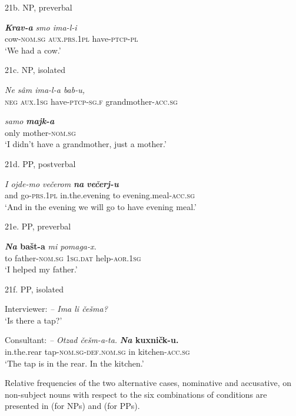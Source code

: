 \documentclass[output=paper]{langscibook}
\begin{document}
21b.     NP, preverbal

\textbf{\textit{Krav-a} } \textit{smo                 ima-l-i}\\
cow-\textsc{nom.sg}  \textsc{aux.prs}.1\textsc{pl}     have-\textsc{ptcp-pl} \\
‘We had a cow.’

21c.     NP, isolated

\textit{Ne    sâm       ima-l-a                bab-u,}\\
\textsc{neg}   \textsc{aux}.1\textsc{sg} have-\textsc{ptcp-sg.f}   grandmother-\textsc{acc.sg}

\textit{samo} \textbf{\textit{majk-a}}\\
only    mother-\textsc{nom.sg}\\
‘I didn’t have a grandmother, just a mother.’

21d.    PP, postverbal

\textit{I        ojde-mo        večerom} \textbf{\textit{na}}  \textbf{\textit{večerj-u}}\\
and  go-\textsc{prs.1pl}     in.the.evening    to  evening.meal-\textsc{acc.sg}\\
‘And in the evening we will go to have evening meal.’

21e.     PP, preverbal

\textbf{\textit{Na} \textbf{bašt-a}                 }\textit{mi           pomaga-x.}\\
to  father-\textsc{nom.sg}   \textsc{1sg.dat}   help-\textsc{aor.1sg}\\
‘I helped my father.’  

21f.      PP, isolated

Interviewer: \textit{– Ima li češma?}  \\
                            ‘Is there a tap?’

Consultant: \textit{– Otzad             češm-a-ta.} \textbf{\textit{Na} \textbf{kuxničk-u.}}\\
                         in.the.rear    tap-\textsc{nom.sg-def.nom.sg}      in   kitchen-\textsc{acc.sg} \\
‘The tap is in the rear. In the kitchen.’

Relative frequencies of the two alternative cases, nominative and accusative, on non-subject nouns with respect to the six combinations of conditions are presented in  (for NPs) and  (for PPs). 
\end{document}
